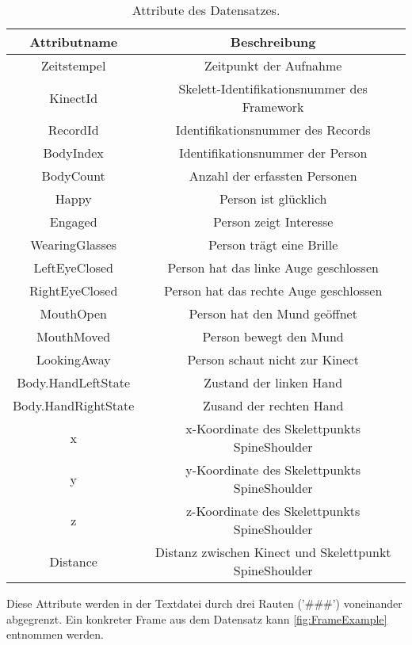 \begin{center}
  \begin{table}[ht]
  \begin{tabular}{ |c|c| } 
   \hline
   Attributname & Beschreibung \\
   \hline \hline
   Zeitstempel & Zeitpunkt der Aufnahme \\
   \hline
   KinectId & Skelett-Identifikationsnummer des Framework  \\
   \hline
   RecordId & Identifikationsnummer des Records \\
   \hline
   BodyIndex & Identifikationsnummer der Person \\
   \hline
   BodyCount & Anzahl der erfassten Personen \\
   \hline
   Happy & Person ist glücklich \\
   \hline
   Engaged & Person zeigt Interesse \\
   \hline
   WearingGlasses & Person trägt eine Brille \\
   \hline
   LeftEyeClosed & Person hat das linke Auge geschlossen \\
   \hline
   RightEyeClosed & Person hat das rechte Auge geschlossen \\
   \hline
   MouthOpen & Person hat den Mund geöffnet \\
   \hline
   MouthMoved & Person bewegt den Mund\\
   \hline
   LookingAway & Person schaut nicht zur Kinect \\
   \hline
   Body.HandLeftState & Zustand der linken Hand \\
   \hline
   Body.HandRightState & Zusand der rechten Hand \\
   \hline
   x & x-Koordinate des Skelettpunkts SpineShoulder \\
   \hline
   y & y-Koordinate des Skelettpunkts SpineShoulder \\
   \hline
   z & z-Koordinate des Skelettpunkts SpineShoulder \\
   \hline
   Distance & Distanz zwischen Kinect und Skelettpunkt SpineShoulder \\
   \hline
  \end{tabular}
  \caption{Attribute des Datensatzes.}
  \label{tbl:AttributesDataset}
  \end{table}
\end{center}
Diese Attribute werden in der Textdatei durch drei Rauten ('\#\#\#') voneinander abgegrenzt.
Ein konkreter Frame aus dem Datensatz kann \autoref{fig:FrameExample} entnommen werden.

